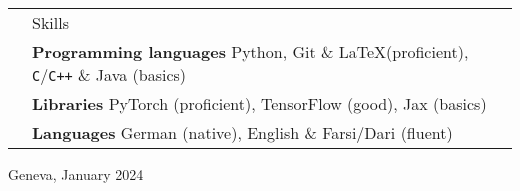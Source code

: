\documentclass[11pt, a4paper]{article}
\newcommand{\headingfont}{\Large\color{OliveGreen}}
\newenvironment{SectionTable}[1]{
	\renewcommand*{\arraystretch}{1.7}
	\setlength{\tabcolsep}{10pt}
	\begin{longtable}{Rp{5.2in}} & #1 \\}
	{\end{longtable}\vspace{-.3cm}}
\begin{document}
    \begin{SectionTable}{\headingfont Skills}
		& \textbf{Programming languages} \newline
		Python, Git \& \LaTeX (proficient), \texttt{C}/\texttt{C++} \& Java (basics) \\
        
        & \textbf{Libraries} \newline
        PyTorch (proficient), TensorFlow (good), Jax (basics) \\
		
		& \textbf{Languages} \newline
		German (native), English \& Farsi/Dari (fluent)
	\end{SectionTable}
		
	\vspace{0.6cm}
	Geneva, January 2024
	
\end{document}
